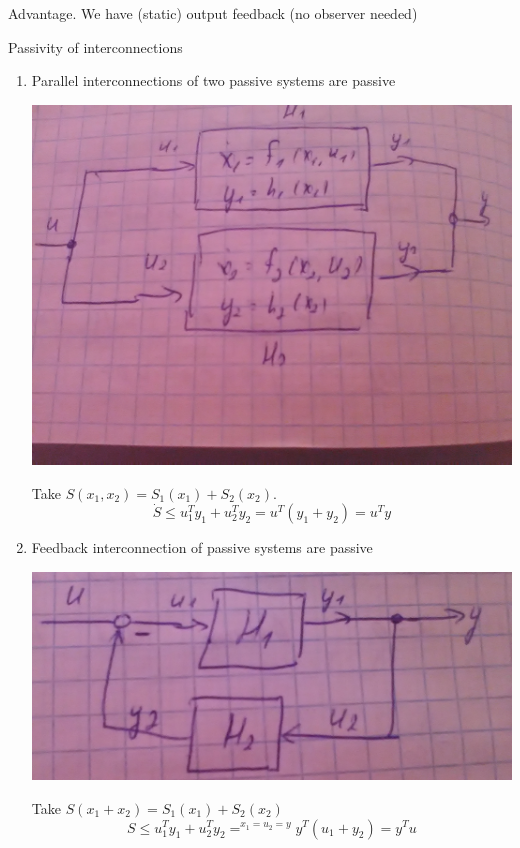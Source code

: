 Advantage. We have (static) output feedback (no observer needed)

Passivity of interconnections
\begin{enumerate}
\item Parallel interconnections of two passive systems are passive 

\begin{center}
	\includegraphics[scale=0.1]{3}
\end{center}

Take $S(x_1,x_2) = S_1(x_1) +S_2(x_2)$.
\begin{equation*}
\dot{S} \leq u_1^Ty_1 + u_2^Ty_2 = u^T(y_1+y_2) = u^Ty
\end{equation*}
\item Feedback interconnection of passive systems are passive

\begin{center}
	\includegraphics[scale=0.1]{4}
\end{center}

Take $S(x_1+x_2) = S_1(x_1) + S_2(x_2)$
\begin{equation*}
S \leq u_1^Ty_1 + u_2^Ty_2 =^{x_1=u_2=y} y^T(u_1+y_2) = y^Tu
\end{equation*}
\end{enumerate}

